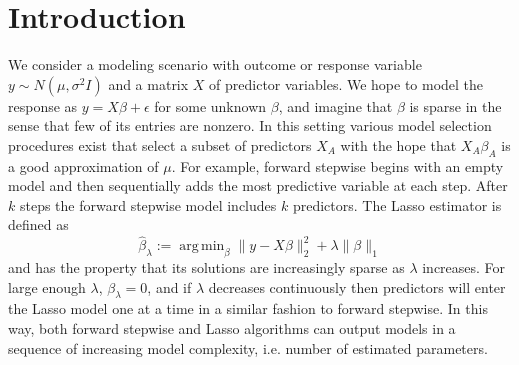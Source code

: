 \documentclass[preprint]{imsart}
\DeclareMathOperator*{\argmin}{arg\,min}
\begin{document}
\section{Introduction}
We consider a modeling scenario with outcome or response variable $y
\sim N(\mu, \sigma^2I)$ and a matrix $X$ of predictor variables. We
hope to model the response as $y = X\beta + \epsilon$ for some unknown
$\beta$, and imagine that $\beta$ is sparse in the sense that few of
its entries are nonzero. In this setting various model selection
procedures exist that select a subset of predictors $X_A$ with the
hope that $X_A\beta_A$ is a good approximation of $\mu$. For example,
forward stepwise begins with an empty model and then sequentially adds
the most predictive variable at each step. After $k$ steps the forward
stepwise model includes $k$ predictors. The Lasso estimator is defined
as 
\begin{equation}
  \label{eq:lasso}
  \hat \beta_\lambda := \argmin_\beta \| y - X\beta \|_2^2 + \lambda \| \beta \|_1
\end{equation}
and has the property that its solutions are increasingly sparse as
$\lambda$ increases. For large enough $\lambda$, $\beta_\lambda = 0$,
and if $\lambda$ decreases continuously then predictors will enter the
Lasso model one at a time in a similar fashion to forward stepwise. In
this way, both forward stepwise and Lasso algorithms can output models
in a sequence of increasing model complexity, i.e. number of estimated
parameters. 
\end{document}
